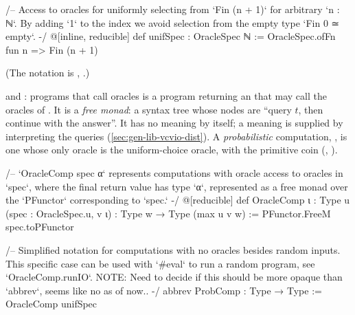 

\begin{leancode}
/-- Access to oracles for uniformly selecting from `Fin (n + 1)` for arbitrary `n : ℕ`.
By adding `1` to the index we avoid selection from the empty type `Fin 0 ≃ empty`. -/
@[inline, reducible] def unifSpec : OracleSpec ℕ :=
  OracleSpec.ofFn fun n => Fin (n + 1)
\end{leancode}


(The notation is , .)

\begin{define}{ and : programs that call oracles}
 is a program returning an  that may call the oracles of
. It is a \emph{free monad}: a syntax tree whose nodes are \enquote{query $t$, then
continue with the answer}. It has no meaning by itself; a meaning is supplied by interpreting
the queries (\cref{sec:gen-lib-vcvio-dist}). A \emph{probabilistic} computation,
, is one whose only oracle is the uniform-choice oracle, with the primitive coin
\lean{$[0..n]} (,
).
\end{define}

\begin{leancode}
/-- `OracleComp spec α` represents computations with oracle access to oracles in `spec`,
where the final return value has type `α`, represented as a free monad over the `PFunctor`
corresponding to `spec.` -/
@[reducible]
def OracleComp {ι : Type u} (spec : OracleSpec.{u, v} ι) :
    Type w → Type (max u v w) :=
  PFunctor.FreeM spec.toPFunctor
\end{leancode}



\begin{leancode}
/-- Simplified notation for computations with no oracles besides random inputs.
This specific case can be used with `#eval` to run a random program, see `OracleComp.runIO`.
NOTE: Need to decide if this should be more opaque than `abbrev`, seems like no as of now.. -/
abbrev ProbComp : Type → Type := OracleComp unifSpec
\end{leancode}


